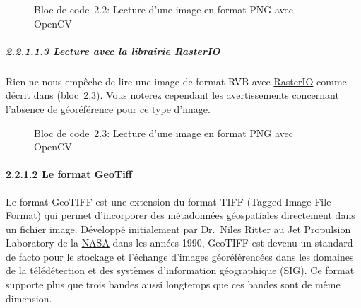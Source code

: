 \label{3c3aaa95}
\label{lst-lecture-opencv-PNG}
\begin{figure}
\centering
{}\label{lst-lecture-opencv-PNG}
\begin{Shaded}
\begin{Highlighting}[]
\OperatorTok{=}\NormalTok{)}
\end{Highlighting}
\end{Shaded}
\caption{Bloc de code~2.2: Lecture d'une image en format PNG avec
OpenCV}
\end{figure}

\subparagraph{\texorpdfstring{{2.2.1.1.3} Lecture avec la librairie
RasterIO}{2.2.1.1.3 Lecture avec la librairie RasterIO}}\label{lecture-avec-la-librairie-rasterio}

Rien ne nous empêche de lire une image de format RVB avec
\href{https://rasterio.readthedocs.io/en/stable/}{RasterIO} comme décrit
dans (\hyperref[lst-lecturerasterioPNG]{bloc~{2.3}}). Vous noterez
cependant les avertissements concernant l'absence de géoréférence pour
ce type d'image.

\label{d7c5205a}
\label{lst-lecturerasterioPNG}
\begin{figure}
\centering
{}\label{lst-lecturerasterioPNG}
\begin{Shaded}
\begin{Highlighting}[]
\OperatorTok{=}\NormalTok{(}\NormalTok{)}
\end{Highlighting}
\end{Shaded}
\caption{Bloc de code~2.3: Lecture d'une image en format PNG avec
OpenCV}
\end{figure}

\paragraph{\texorpdfstring{{2.2.1.2} Le format
GeoTiff}{2.2.1.2 Le format GeoTiff}}\label{le-format-geotiff}

Le format GeoTIFF est une extension du format TIFF (Tagged Image File
Format) qui permet d'incorporer des métadonnées géospatiales directement
dans un fichier image. Développé initialement par Dr.~Niles Ritter au
Jet Propulsion Laboratory de la
\href{https://www.earthdata.nasa.gov/esdis/esco/standards-and-practices/geotiff}{NASA}
dans les années 1990, GeoTIFF est devenu un standard de facto pour le
stockage et l'échange d'images géoréférencées dans les domaines de la
télédétection et des systèmes d'information géographique (SIG). Ce
format supporte plus que trois bandes aussi longtemps que ces bandes
sont de même dimension.

